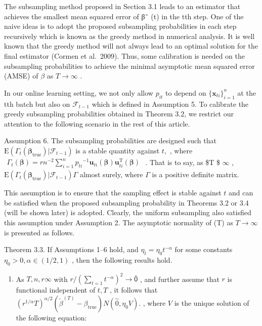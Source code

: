 \documentclass[
  10
]{article}
\providecommand{\tightlist}{%
  \setlength{\itemsep}{0pt}\setlength{\parskip}{0pt}}
\begin{document}
The subsampling method proposed in Section 3.1 leads to an estimator
that achieves the smallest mean squared error of β˜ (t) in the tth step.
One of the naive ideas is to adopt the proposed subsampling
probabilities in each step recursively which is known as the greedy
method in numerical analysis. It is well known that the greedy method
will not always lead to an optimal solution for the final estimator
(Cormen et al.~2009). Thus, some calibration is needed on the
subsampling probabilities to achieve the minimal asymptotic mean squared
error (AMSE) of \(\beta\) as \(T \to \infty\) .

In our online learning setting, we not only allow \(p _ { i t }\) to
depend on \(\{ \pmb { x } _ { t i } \} _ { i = 1 } ^ { n }\) at the tth
batch but also on \(\mathcal { F } _ { t - 1 }\) which is defined in
Assumption 5. To calibrate the greedy subsampling probabilities obtained
in Theorem 3.2, we restrict our attention to the following scenario in
the rest of this article.

Assumption 6. The subsampling probabilities are designed such that
\(\mathrm { E } ( \Gamma _ { t } ( \pmb { \beta } _ { \mathrm { t r u e } } ) | \mathcal { F } _ { t - 1 } )\)
is a stable quantity against \(t ,\) , where
\(\begin{array} { r } { \Gamma _ { t } ( \pmb { \beta } ) = r n ^ { - 2 } \sum _ { i = 1 } ^ { n } { p _ { t i } } ^ { - 1 } \pmb { u } _ { t i } ( \pmb { \beta } ) \pmb { u } _ { t i } ^ { \mathrm { T } } ( \pmb { \beta } ) } \end{array}\)
. That is to say, as \$T \$ \(\infty\) ,
\(\mathrm { E } ( \Gamma _ { t } ( \pmb { \beta } _ { \mathrm { t r u e } } ) | \mathcal { F } _ { t - 1 } )  \Gamma\)
almost surely, where \(\Gamma\) is a positive definite matrix.

This assumption is to ensure that the sampling effect is stable against
\(t\) and can be satisfied when the proposed subsampling probability in
Theorems 3.2 or 3.4 (will be shown later) is adopted. Clearly, the
uniform subsampling also satisfied this assumption under Assumption 2.
The asymptotic normality of (T) as \(T \to \infty\) is presented as
follows.

Theorem 3.3. If Assumptions 1--6 hold, and
\(\eta _ { t } = \eta _ { 0 } t ^ { - \alpha }\) for some constants
\(\eta _ { 0 } > 0 , \alpha \in ( 1 / 2 , 1 )\) , then the following
results hold.

\begin{enumerate}
\def\labelenumi{\roman{enumi}.}
\tightlist
\item
  As \(T , n , r  \infty\) with
  \(r / ( \sum _ { t = 1 } t ^ { - \alpha } ) ^ { 2 } \to \mathsf { \bar { 0 } }\)
  , and further assume that \(r\) is functional independent of \(t , T\)
  , it follows that
  \(( r ^ { 1 / \alpha } T ) ^ { \alpha / 2 } ( \tilde { \beta } ^ { ( T ) } - \beta _ { \mathrm { t r u e } } )  N ( \stackrel { \sim } { 0 } , \eta _ { 0 } V ) .\)
  , where \(V\) is the unique solution of the following equation:
\end{enumerate}
\end{document}
